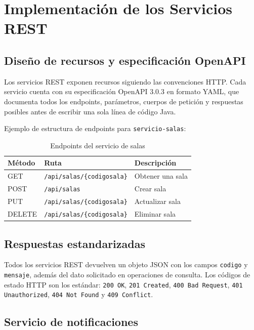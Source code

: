 \documentclass[12pt, a4paper]{article}
\begin{document}
\section{Implementación de los Servicios REST}

\subsection{Diseño de recursos y especificación OpenAPI}

Los servicios REST exponen recursos siguiendo las convenciones HTTP. Cada servicio cuenta con su especificación OpenAPI 3.0.3 en formato YAML, que documenta todos los endpoints, parámetros, cuerpos de petición y respuestas posibles antes de escribir una sola línea de código Java.

Ejemplo de estructura de endpoints para \texttt{servicio-salas}:

\begin{table}[H]
  \centering
  \begin{tabular}{lll}
    \toprule
    \textbf{Método} & \textbf{Ruta} & \textbf{Descripción} \\
    \midrule
    GET    & \texttt{/api/salas/\{codigosala\}} & Obtener una sala \\
    POST   & \texttt{/api/salas}                & Crear sala \\
    PUT    & \texttt{/api/salas/\{codigosala\}} & Actualizar sala \\
    DELETE & \texttt{/api/salas/\{codigosala\}} & Eliminar sala \\
    \bottomrule
  \end{tabular}
  \caption{Endpoints del servicio de salas}
\end{table}

\subsection{Respuestas estandarizadas}

Todos los servicios REST devuelven un objeto JSON con los campos \texttt{codigo} y \texttt{mensaje}, además del dato solicitado en operaciones de consulta. Los códigos de estado HTTP son los estándar: \texttt{200 OK}, \texttt{201 Created}, \texttt{400 Bad Request}, \texttt{401 Unauthorized}, \texttt{404 Not Found} y \texttt{409 Conflict}.

\subsection{Servicio de notificaciones}
\end{document}
